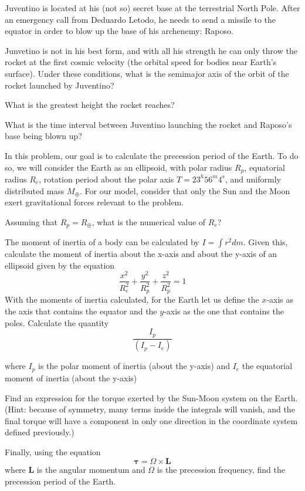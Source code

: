 \documentclass[11pt]{article}
\begin{document}
\begin{pproblem} Juventino is located at his (not so) secret base at the terrestrial North Pole. After an emergency call from Deduardo Letodo, he needs to send a missile to the equator in order to blow up the base of his archenemy: Raposo. 
    \begin{alternativas}
        \item Junvetino is not in his best form, and with all his strength he can only throw the rocket at the first cosmic velocity (the orbital speed for bodies near Earth's surface). Under these conditions, what is the semimajor axis of the orbit of the rocket launched by Juventino?
        \item What is the greatest height the rocket reaches?
        \item What is the time interval between Juventino launching the rocket and Raposo's base being blown up?
    \end{alternativas}
    
\end{pproblem}

\begin{pproblem}
    In this problem, our goal is to calculate the precession period of the Earth. To do so, we will consider the Earth as an ellipsoid, with polar radius $R_p$, equatorial radius $R_e$, rotation period about the polar axis $T = 23^h56^m4^s$, and uniformly distributed mass $M_\oplus$. For our model, consider that only the Sun and the Moon exert gravitational forces relevant to the problem.
    \begin{alternativas}
        \item Assuming that $R_p = R_\oplus$, what is the numerical value of $R_e$?
        
        \item The moment of inertia of a body can be calculated by $I = \int r^2 dm$. Given this, calculate the moment of inertia about the x-axis and about the y-axis of an ellipsoid given by the equation 
        $$\frac{x^2}{R_e^2} + \frac{y^2}{R_p^2} + \frac{z^2}{R_p^2}= 1$$
        With the moments of inertia calculated, for the Earth let us define the $x$-axis as the axis that contains the equator and the $y$-axis as the one that contains the poles. Calculate the quantity 
        $$\frac{I_p}{(I_p-I_e)}$$

        where $I_p$ is the polar moment of inertia (about the y-axis) and $I_e$ the equatorial moment of inertia (about the y-axis)
        

        \item Find an expression for the torque exerted by the Sun-Moon system on the Earth. (Hint: because of symmetry, many terms inside the integrals will vanish, and the final torque will have a component in only one direction in the coordinate system defined previously.)
        \item Finally, using the equation 
        $$\mathbf{\tau } = \Omega \times \mathbf{L} $$
        where $\mathbf{L}$ is the angular momentum and $\Omega$ is the precession frequency, find the precession period of the Earth.
    \end{alternativas}
\end{pproblem}

    
\end{document}
